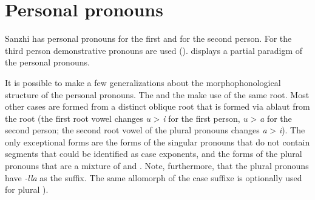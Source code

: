 
\section{Personal pronouns}
\label{sec:Personal pronouns}

Sanzhi has personal pronouns for the first and for the second person. For the third person demonstrative pronouns are used ().  displays a partial paradigm of the personal pronouns.

It is possible to make a few generalizations about the morphophonological structure of the personal pronouns. The  and the  make use of the same root. Most other cases are formed from a distinct oblique root that is formed via ablaut from the  root (the first root vowel changes \textit{u} > \textit{i} for the first person, \textit{u} > \textit{a} for the second person; the second root vowel of the plural pronouns changes \textit{a} > \textit{i}). The only exceptional forms are the  forms of the singular pronouns that do not contain segments that could be identified as  case exponents, and the  forms of the plural pronouns that are a mixture of  and . Note, furthermore, that the plural pronouns have \textit{-lla} as the  suffix. The same allomorph of the  case suffixe is optionally used for plural  ).

